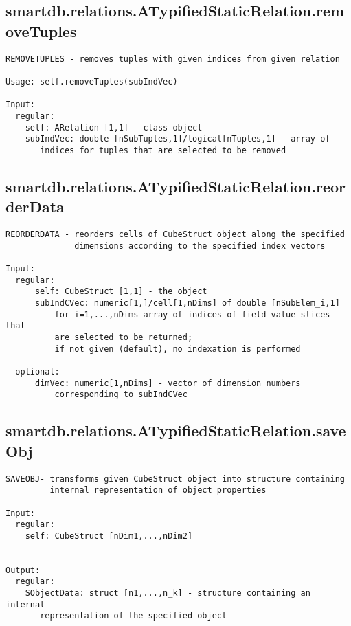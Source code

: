 \subsection{\texorpdfstring{smartdb.relations.ATypifiedStaticRelation.removeTuples}{removeTuples}}\label{method:smartdb.relations.ATypifiedStaticRelation.removeTuples}
\begin{verbatim}
REMOVETUPLES - removes tuples with given indices from given relation

Usage: self.removeTuples(subIndVec)

Input:
  regular:
    self: ARelation [1,1] - class object
    subIndVec: double [nSubTuples,1]/logical[nTuples,1] - array of
       indices for tuples that are selected to be removed
\end{verbatim}
\subsection{\texorpdfstring{smartdb.relations.ATypifiedStaticRelation.reorderData}{reorderData}}\label{method:smartdb.relations.ATypifiedStaticRelation.reorderData}
\begin{verbatim}
REORDERDATA - reorders cells of CubeStruct object along the specified
              dimensions according to the specified index vectors

Input:
  regular:
      self: CubeStruct [1,1] - the object
      subIndCVec: numeric[1,]/cell[1,nDims] of double [nSubElem_i,1]
          for i=1,...,nDims array of indices of field value slices that
          are selected to be returned;
          if not given (default), no indexation is performed

  optional:
      dimVec: numeric[1,nDims] - vector of dimension numbers
          corresponding to subIndCVec
\end{verbatim}
\subsection{\texorpdfstring{smartdb.relations.ATypifiedStaticRelation.saveObj}{saveObj}}\label{method:smartdb.relations.ATypifiedStaticRelation.saveObj}
\begin{verbatim}
SAVEOBJ- transforms given CubeStruct object into structure containing
         internal representation of object properties

Input:
  regular:
    self: CubeStruct [nDim1,...,nDim2]


Output:
  regular:
    SObjectData: struct [n1,...,n_k] - structure containing an internal
       representation of the specified object
\end{verbatim}
